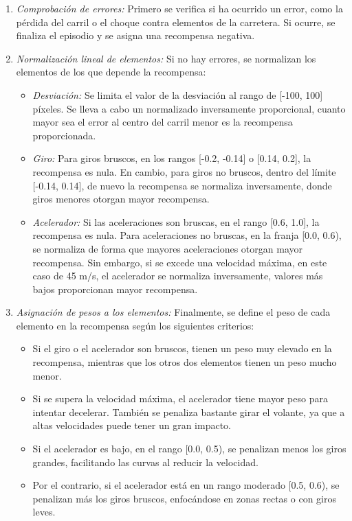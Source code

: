 \begin{enumerate}
\item \textit{Comprobación de errores:} Primero se verifica si ha ocurrido un error, como la pérdida del carril o el choque contra elementos de la carretera. Si ocurre, se finaliza el episodio y se asigna una recompensa negativa.
\item \textit{Normalización lineal de elementos:} Si no hay errores, se normalizan los elementos de los que depende la recompensa:
\begin{itemize}
\item \textit{Desviación:} Se limita el valor de la desviación al rango de [-100, 100] píxeles. Se lleva a cabo un normalizado inversamente proporcional, cuanto mayor sea el error al centro del carril menor es la recompensa proporcionada.
\item \textit{Giro:} Para giros bruscos, en los rangos [-0.2, -0.14] o [0.14, 0.2], la recompensa es nula. En cambio, para giros no bruscos, dentro del límite [-0.14, 0.14], de nuevo la recompensa se normaliza inversamente, donde giros menores otorgan mayor recompensa.
\item \textit{Acelerador:} Si las aceleraciones son bruscas, en el rango [0.6, 1.0], la recompensa es nula. Para aceleraciones no bruscas, en la franja [0.0, 0.6), se normaliza de forma que mayores aceleraciones otorgan mayor recompensa. Sin embargo, si se excede una velocidad máxima, en este caso de 45 m/s, el acelerador se normaliza inversamente, valores más bajos proporcionan mayor recompensa.
\end{itemize}

\item \textit{Asignación de pesos a los elementos:} Finalmente, se define el peso de cada elemento en la recompensa según los siguientes criterios:
\begin{itemize}
\item Si el giro o el acelerador son bruscos, tienen un peso muy elevado en la recompensa, mientras que los otros dos elementos tienen un peso mucho menor.
\item Si se supera la velocidad máxima, el acelerador tiene mayor peso para intentar decelerar. También se penaliza bastante girar el volante, ya que a altas velocidades puede tener un gran impacto.
\item Si el acelerador es bajo, en el rango [0.0, 0.5), se penalizan menos los giros grandes, facilitando las curvas al reducir la velocidad.
\item Por el contrario, si el acelerador está en un rango moderado [0.5, 0.6), se penalizan más los giros bruscos, enfocándose en zonas rectas o con giros leves.
\end{itemize}
\end{enumerate}

